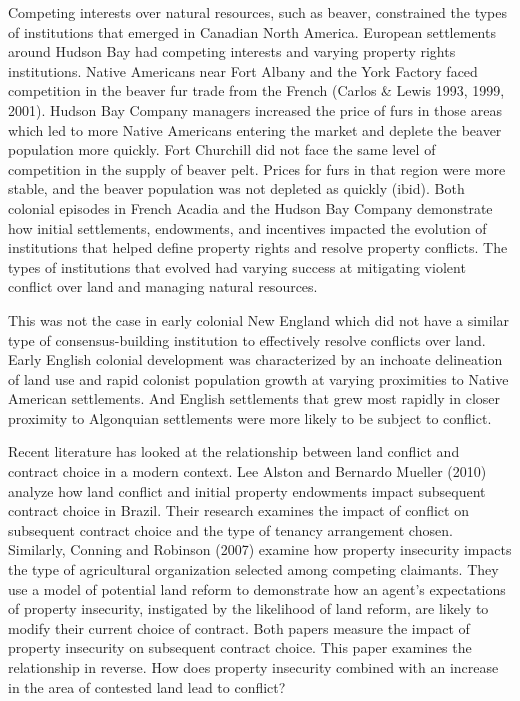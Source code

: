 \documentclass[sn-mathphys]{sn-jnl}%
\theoremstyle{thmstyleone}%
\theoremstyle{thmstyletwo}%
\theoremstyle{thmstylethree}%
\begin{document}
Competing interests over natural resources, such as beaver, constrained the types of institutions that emerged in Canadian North America. European settlements around Hudson Bay had competing interests and varying property rights institutions. Native Americans near Fort Albany and the York Factory faced competition in the beaver fur trade from the French (Carlos \& Lewis 1993, 1999, 2001). Hudson Bay Company managers increased the price of furs in those areas which led to more Native Americans entering the market and deplete the beaver population more quickly. Fort Churchill did not face the same level of competition in the supply of beaver pelt. Prices for furs in that region were more stable, and the beaver population was not depleted as quickly (ibid). Both colonial episodes in French Acadia and the Hudson Bay Company demonstrate how initial settlements, endowments, and incentives impacted the evolution of institutions that helped define property rights and resolve property conflicts. The types of institutions that evolved had varying success at mitigating violent conflict over land and managing natural resources. 

This was not the case in early colonial New England which did not have a similar type of consensus-building institution to effectively resolve conflicts over land. Early English colonial development was characterized by an inchoate delineation of land use and rapid colonist population growth at varying proximities to Native American settlements. And English settlements that grew most rapidly in closer proximity to Algonquian settlements were more likely to be subject to conflict.

Recent literature has looked at the relationship between land conflict and contract choice in a modern context. %
Lee Alston and Bernardo Mueller (2010) analyze how land conflict and initial property endowments impact subsequent contract choice in Brazil. Their research examines the impact of conflict on subsequent contract choice and the type of tenancy arrangement chosen. Similarly, Conning and Robinson (2007) examine how property insecurity impacts the type of agricultural organization selected among competing claimants. They use a model of potential land reform to demonstrate how an agent's expectations of property insecurity, instigated by the likelihood of land reform, are likely to modify their current choice of contract. Both papers measure the impact of property insecurity on subsequent contract choice. This paper examines the relationship in reverse. How does property insecurity combined with an increase in the area of contested land lead to conflict?
\end{document}
